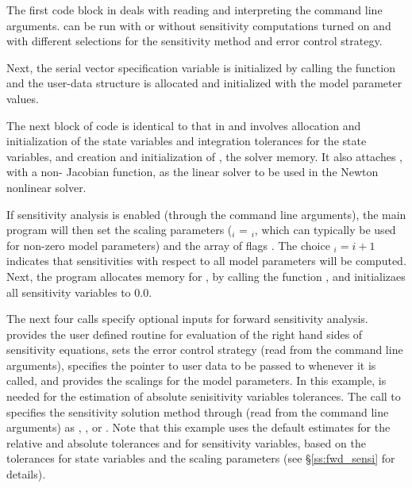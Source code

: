 The first code block in  deals with reading and interpreting the
command line arguments.  can be run with or without sensitivity computations
turned on and with different selections for the sensitivity method and error control strategy.

Next, the serial vector specification variable  is initialized by calling
the {\nvecs} function  and the user-data structure is allocated
and initialized with the model parameter values.

The next block of code is identical to that in  and involves allocation and 
initialization of the state variables and integration tolerances for the state variables,
and creation and initialization of , the {\cvodes} solver memory. 
It also attaches {\cvdense}, with a non- Jacobian function, as the linear solver 
to be used in the Newton nonlinear solver.

If sensitivity analysis is enabled (through the command line arguments), 
the main program will then set the scaling parameters
 ($_i$ = $_i$, which can typically be used for 
non-zero model parameters) and the array of flags . The choice $_i=i+1$
indicates that sensitivities with respect to all model parameters will be computed.
Next, the program allocates memory for , by calling the {\nvector} function 
, and initializaes all sensitivity variables to $0.0$.

The next four calls specify optional inputs for forward sensitivity analysis.
 provides the user defined routine for evaluation of the right hand
sides of sensitivity equations,  sets the error control strategy
(read from the command line arguments),  specifies the pointer to
user data to be passed to  whenever it is called, and  provides 
the scalings for the model parameters. In this example,  is needed for the 
estimation of absolute senisitivity variables tolerances.
The call to  specifies the sensitivity solution method through 
 (read from the command line arguments) as , 
, or .
Note that this example uses the default estimates for the relative and absolute tolerances 
 and  for sensitivity variables, based on the tolerances for state 
variables and the scaling parameters  (see \S\ref{ss:fwd_sensi} for details).

